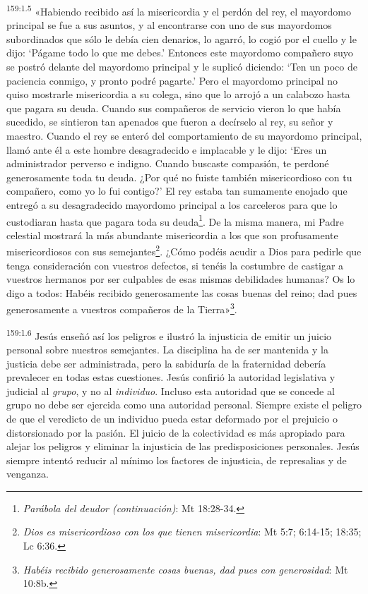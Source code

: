 \par 
\textsuperscript{159:1.5} «Habiendo recibido así la misericordia y el perdón del rey, el mayordomo principal se fue a sus asuntos, y al encontrarse con uno de sus mayordomos subordinados que sólo le debía cien denarios, lo agarró, lo cogió por el cuello y le dijo: `Págame todo lo que me debes.' Entonces este mayordomo compañero suyo se postró delante del mayordomo principal y le suplicó diciendo: `Ten un poco de paciencia conmigo, y pronto podré pagarte.' Pero el mayordomo principal no quiso mostrarle misericordia a su colega, sino que lo arrojó a un calabozo hasta que pagara su deuda. Cuando sus compañeros de servicio vieron lo que había sucedido, se sintieron tan apenados que fueron a decírselo al rey, su señor y maestro. Cuando el rey se enteró del comportamiento de su mayordomo principal, llamó ante él a este hombre desagradecido e implacable y le dijo: `Eres un administrador perverso e indigno. Cuando buscaste compasión, te perdoné generosamente toda tu deuda. ¿Por qué no fuiste también misericordioso con tu compañero, como yo lo fui contigo?' El rey estaba tan sumamente enojado que entregó a su desagradecido mayordomo principal a los carceleros para que lo custodiaran hasta que pagara toda su deuda\footnote{\textit{Parábola del deudor (continuación)}: Mt 18:28-34.}. De la misma manera, mi Padre celestial mostrará la más abundante misericordia a los que son profusamente misericordiosos con sus semejantes\footnote{\textit{Dios es misericordioso con los que tienen misericordia}: Mt 5:7; 6:14-15; 18:35; Lc 6:36.}. ¿Cómo podéis acudir a Dios para pedirle que tenga consideración con vuestros defectos, si tenéis la costumbre de castigar a vuestros hermanos por ser culpables de esas mismas debilidades humanas? Os lo digo a todos: Habéis recibido generosamente las cosas buenas del reino; dad pues generosamente a vuestros compañeros de la Tierra»\footnote{\textit{Habéis recibido generosamente cosas buenas, dad pues con generosidad}: Mt 10:8b.}.

\par 
\textsuperscript{159:1.6} Jesús enseñó así los peligros e ilustró la injusticia de emitir un juicio personal sobre nuestros semejantes. La disciplina ha de ser mantenida y la justicia debe ser administrada, pero la sabiduría de la fraternidad debería prevalecer en todas estas cuestiones. Jesús confirió la autoridad legislativa y judicial al \textit{grupo}, y no al \textit{individuo}. Incluso esta autoridad que se concede al grupo no debe ser ejercida como una autoridad personal. Siempre existe el peligro de que el veredicto de un individuo pueda estar deformado por el prejuicio o distorsionado por la pasión. El juicio de la colectividad es más apropiado para alejar los peligros y eliminar la injusticia de las predisposiciones personales. Jesús siempre intentó reducir al mínimo los factores de injusticia, de represalias y de venganza.

